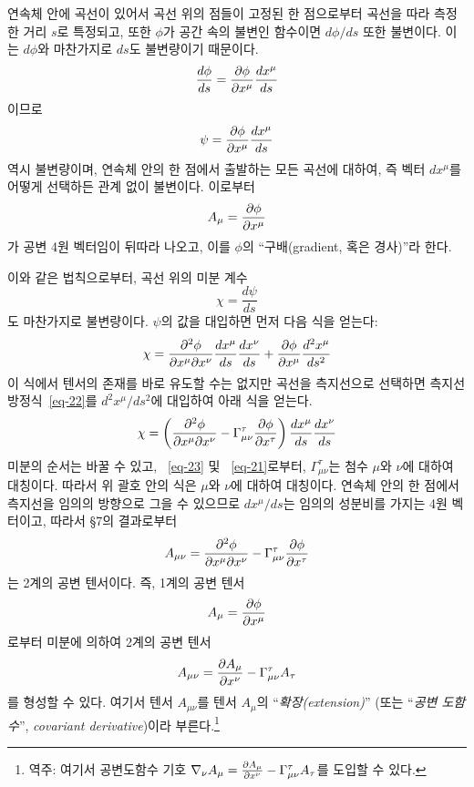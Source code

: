 \documentclass[b5paper]{article}
\begin{document}
연속체 안에 곡선이 있어서 곡선 위의 점들이 고정된 한 점으로부터 곡선을 따라 측정한 거리 $s$로 특정되고, 또한 $\phi$가 공간 속의 불변인 함수이면 $d\phi/ds$ 또한 불변이다. 이는 $d\phi$와 마찬가지로 $ds$도 불변량이기 때문이다.
\begin{equation*}
	\dfrac{d\phi}{ds}={\frac{{\partial}{\phi}}{{\partial}{x^\mu}}} \dfrac{dx^\mu}{ds}
\end{equation*} 
이므로
\begin{equation*}
	\psi={\frac{{\partial}{\phi}}{{\partial}{x^\mu}}} \dfrac{dx^\mu}{ds}
\end{equation*} 
역시 불변량이며, 연속체 안의 한 점에서 출발하는 모든 곡선에 대하여, 즉 벡터 $ dx^\mu $를 어떻게 선택하든 관계 없이 불변이다. 이로부터
\begin{equation} \label{eq-24}
	A_\mu={\frac{{\partial}{\phi}}{{\partial}{x^\mu}}}
\end{equation}
가 공변 4원 벡터임이 뒤따라 나오고, 이를 $\phi$의 ``구배(gradient, 혹은 경사)''라 한다.\par
이와 같은 법칙으로부터, 곡선 위의 미분 계수
\begin{equation*}
	\chi=\dfrac{d\psi}{ds}
\end{equation*}
도 마찬가지로 불변량이다. $\psi$의 값을 대입하면 먼저 다음 식을 얻는다:
\begin{equation*}
	\chi={\frac{{\partial^2}{\phi}}{{\partial}{x^\mu}{\partial}{x^\nu}}} \dfrac{dx^\mu}{ds} \dfrac{dx^\nu}{ds} 
	+ {\frac{{\partial}{\phi}}{{\partial}{x^\mu}}} \dfrac{d^2 x^\mu}{ds^2}
\end{equation*}
이 식에서 텐서의 존재를 바로 유도할 수는 없지만 곡선을 측지선으로 선택하면 측지선 방정식~\eqref{eq-22}를 $d^2 x^\mu / ds^2$에 대입하여 아래 식을 얻는다.
\begin{equation*}
	\chi=\left( {\frac{{\partial^2}{\phi}}{{\partial}{x^\mu}{\partial}{x^\nu}}}  
	            - \Gamma_{\mu\nu}^\tau {\frac{{\partial}{\phi}}{{\partial}{x^\tau}}} 
	     \right) \dfrac{dx^\mu}{ds} \dfrac{dx^\nu}{ds}
\end{equation*}
미분의 순서는 바꿀 수 있고, ~\eqref{eq-23} 및 ~\eqref{eq-21}로부터, $\Gamma_{\mu\nu}^\tau$는 첨수 $\mu$와 $\nu$에 대하여 대칭이다. 따라서 위 괄호 안의 식은 $\mu$와 $\nu$에 대하여 대칭이다. 연속체 안의 한 점에서 측지선을 임의의 방향으로 그을 수 있으므로 $dx^\mu/ds$는 임의의 성분비를 가지는 4원 벡터이고, 따라서 \S 7의 결과로부터
\begin{equation} \label{eq-25}
	A_{\mu\nu} = {\frac{{\partial^2}{\phi}}{{\partial}{x^\mu}{\partial}{x^\nu}}}  
	- \Gamma_{\mu\nu}^\tau {\frac{{\partial}{\phi}}{{\partial}{x^\tau}}} 
\end{equation}
는 2계의 공변 텐서이다.
즉, 1계의 공변 텐서
\begin{equation*}
	A_\mu={\frac{{\partial}{\phi}}{{\partial}{x^\mu}}}
\end{equation*}
로부터 미분에 의하여 2계의 공변 텐서
\begin{equation} \label{eq-26}
A_{\mu\nu} = {\frac{{\partial}{A_\mu}}{{\partial}{x^\nu}}} 
- \Gamma_{\mu\nu}^\tau A_\tau
\end{equation}
를 형성할 수 있다. 여기서 텐서 $A_{\mu\nu}$를 텐서 $A_\mu$의 ``\emph{확장(extension)}'' (또는 ``\emph{공변 도함수}'', \emph{covariant derivative})이라 부른다.\footnote{역주: 여기서 공변도함수 기호 $\nabla_\nu A_\mu={\frac{{\partial}{A_\mu}}{{\partial}{x^\nu}}} - \Gamma_{\mu\nu}^\tau A_\tau$를 도입할 수 있다.}
\end{document}
